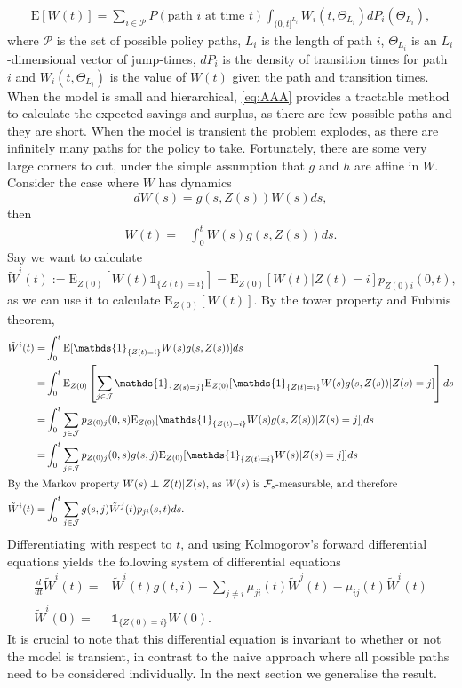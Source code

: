 \documentclass[12pt]{article}
\newcommand{\E}{\text{E}}
\newcommand{\indic}[1]{\mathds{1}_{ \{ #1 \} }}
\newcommand\independent{\protect\mathpalette{\protect\independenT}{\perp}}
\def\independenT#1#2{\mathrel{\rlap{$#1#2$}\mkern2mu{#1#2}}}
\theoremstyle{my_thm}
\begin{document}
\begin{align}
\E[W(t)]= \sum_{i \in \mathcal{P}}  P(\text{path }i \text{ at time } t) \int_{(0,t]^{L_i}} W_i(t,\Theta_{L_i}) dP_i(\Theta_{L_i}),
\label{eq:AAA}
\end{align} 
where $\mathcal{P}$ is the set of possible policy paths, $L_i$ is the length of path $i$, $\Theta_{L_i}$ is an $L_i$-dimensional vector of jump-times, $dP_i$ is the density of transition times for path $i$ and $W_i(t,\Theta_{L_i})$ is the value of $W(t)$ given the path and transition times.
\\
When the model is small and hierarchical, \eqref{eq:AAA} provides a tractable method to calculate the expected savings and surplus, as there are few possible paths and they are short. When the model is transient the problem explodes, as there are infinitely many paths for the policy to take. Fortunately, there are some very large corners to cut, under the simple assumption that $g$ and $h$ are affine in $W$. Consider the case where $W$ has dynamics
$$
dW(s)=g(s,Z(s))W(s) ds,
$$
then
\begin{align*}
W(t)
=& \int_0^t W(s) g(s,Z(s)) ds.
\end{align*}
Say we want to calculate 
$$
\tilde{W}^i(t):=\E_{Z(0)}[W(t)\indic{Z(t)=i}]
=\E_{Z(0)}[W(t)|Z(t)=i]p_{Z(0)i}(0,t),
$$ 
as we can use it to calculate $\E_{Z(0)}[W(t)]$. By the tower property and Fubinis theorem,
\begin{align*}
\tilde{W}^i(t)
=&
\int_0^t \E[ \indic{Z(t)=i} W(s) g(s,Z(s))] ds
\\
=&
\int_0^t \E_{Z(0)} \left[ \sum_{j \in \mathcal{J}} \indic{Z(s)=j}\E_{Z(0)}[ \indic{Z(t)=i} W(s) g(s,Z(s))|Z(s)=j] \right] ds\\
=&
\int_0^t  \sum_{j \in \mathcal{J}} p_{Z(0)j}(0,s)\E_{Z(0)}[ \indic{Z(t)=i} W(s) g(s,Z(s))|Z(s)=j]] ds\\
=&
\int_0^t  \sum_{j \in \mathcal{J}} p_{Z(0)j}(0,s)g(s,j) \E_{Z(0)}[ \indic{Z(t)=i} W(s)|Z(s)=j]] ds\\
\intertext{By the Markov property $W(s)\independent Z(t)|Z(s)$, as $W(s)$ is $\mathcal{F}_s$-measurable, and therefore}
\tilde{W}^i(t)=&
\int_0^t  \sum_{j \in \mathcal{J}} g(s,j) \tilde{W}^j(t) p_{ji}(s,t)ds.
\end{align*}
Differentiating with respect to $t$, and using Kolmogorov's forward differential equations yields the following system of differential equations
\begin{align*}
\frac{d}{dt} \tilde{W}^i(t)=&\tilde{W}^i(t)g(t,i)+ \sum_{j\neq i} \mu_{ji}(t)\tilde{W}^j(t)-\mu_{ij}(t)\tilde{W}^i(t)
\\
\tilde{W}^i(0)=&\indic{Z(0)=i}W(0).
\end{align*}
It is crucial to note that this differential equation is invariant to whether or not the model is transient, in contrast to the naive approach where all possible paths need to be considered individually. In the next section we generalise the result.
\end{document}

